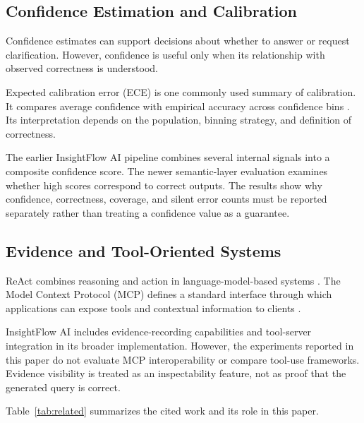 \documentclass[conference]{IEEEtran}
\begin{document}
\subsection{Confidence Estimation and Calibration}

Confidence estimates can support decisions about whether to answer or request clarification. However, confidence is useful only when its relationship with observed correctness is understood.

Expected calibration error (ECE) is one commonly used summary of calibration. It compares average confidence with empirical accuracy across confidence bins \cite{naeini2015bbq}. Its interpretation depends on the population, binning strategy, and definition of correctness.

The earlier InsightFlow AI pipeline combines several internal signals into a composite confidence score. The newer semantic-layer evaluation examines whether high scores correspond to correct outputs. The results show why confidence, correctness, coverage, and silent error counts must be reported separately rather than treating a confidence value as a guarantee.

\subsection{Evidence and Tool-Oriented Systems}

ReAct combines reasoning and action in language-model-based systems \cite{yao2023react}. The Model Context Protocol (MCP) defines a standard interface through which applications can expose tools and contextual information to clients \cite{mcp}.

InsightFlow AI includes evidence-recording capabilities and tool-server integration in its broader implementation. However, the experiments reported in this paper do not evaluate MCP interoperability or compare tool-use frameworks. Evidence visibility is treated as an inspectability feature, not as proof that the generated query is correct.

Table~\ref{tab:related} summarizes the cited work and its role in this paper.
\end{document}

